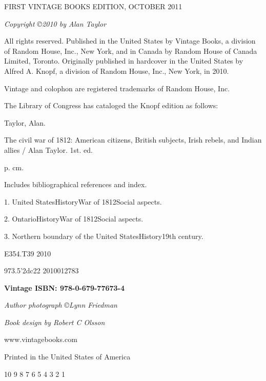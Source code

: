 \begin{tcolorbox}[enhanced,width=4.2in,left=.4in, right=.4in,
   drop fuzzy shadow southeast,
    boxrule=0.4pt,sharp corners,colframe=black!80!black,colback=white!10]

\bigskip
\bigskip
\bigskip
\bigskip

\begin{center}

{\scriptsize FIRST VINTAGE BOOKS EDITION, OCTOBER 2011

\medskip

\emph{Copyright \copyright 2010 by Alan Taylor}

\medskip

All rights reserved. Published in the United States by Vintage Books,
a division of Random House, Inc., New York, and in Canada by
Random House of Canada Limited, Toronto. Originally published in hardcover in the United States by Alfred A. Knopf, a division of Random House, Inc., New York, in 2010.

\medskip

Vintage and colophon are registered trademarks of Random House, Inc.

\medskip

The Library of Congress has cataloged the Knopf edition as follows:

Taylor, Alan.

The civil war of 1812: American citizens, British subjects, Irish rebels, and Indian allies / Alan Taylor. \textemdash 1st. ed.

p. cm.

Includes bibliographical references and index.

1. United States\textemdash History\textemdash War of 1812\textemdash Social aspects.

2. Ontario\textemdash History\textemdash War of 1812\textemdash Social aspects.

3. Northern boundary of the United States\textemdash History\textemdash 19th century.

E354.T39 2010

973.5'2\textemdash dc22 2010012783

\textbf{Vintage ISBN: 978-0-679-77673-4}

\emph{Author photograph} \copyright \emph{Lynn Friedman}

\emph{Book design by Robert C Olsson}

www.vintagebooks.com

Printed in the United States of America

10 9 8 7 6 5 4 3 2 1

}


\end{center}
\bigskip
\smallskip
\smallskip

\end{tcolorbox}





